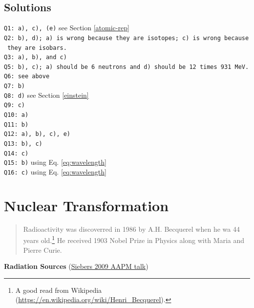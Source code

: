 \documentclass[]{book}
\let\rmarkdownfootnote\footnote%
\def\footnote{\protect\rmarkdownfootnote}
\theoremstyle{definition}
\theoremstyle{definition}
\theoremstyle{definition}
\theoremstyle{remark}
\begin{document}
\section{Solutions}\label{solutions}

\texttt{Q1:\ a),\ c),\ (e)} see Section \ref{atomic-rep}\\
\texttt{Q2:\ b),\ d);\ a)\ is\ wrong\ because\ they\ are\ isotopes;\ c)\ is\ wrong\ because\ they\ are\ isobars.}\\
\texttt{Q3:\ a),\ b),\ and\ c)}\\
\texttt{Q5:\ b),\ c);\ a)\ should\ be\ 6\ neutrons\ and\ d)\ should\ be\ 12\ times\ 931\ MeV.}\\
\texttt{Q6:\ see\ above}\\
\texttt{Q7:\ b)}\\
\texttt{Q8:\ d)} see Section \ref{einstein}\\
\texttt{Q9:\ c)}\\
\texttt{Q10:\ a)}\\
\texttt{Q11:\ b)}\\
\texttt{Q12:\ a),\ b),\ c),\ e)}\\
\texttt{Q13:\ b),\ c)}\\
\texttt{Q14:\ c)}\\
\texttt{Q15:\ b)} using Eq. \eqref{eq:wavelength}\\
\texttt{Q16:\ c)} using Eq. \eqref{eq:wavelength}

\chapter{Nuclear Transformation}\label{nut}

\begin{quote}
Radioactivity was discoverred in 1986 by A.H. Becquerel when he wa 44
years old.\footnote{A good read from Wikipedia
  (\url{https://en.wikipedia.org/wiki/Henri_Becquerel}).} He received
1903 Nobel Prize in Physics along with Maria and Pierre Curie.
\end{quote}

\textbf{Radiation Sources} (\href{https://vimeo.com/78875937}{Siebers
2009 AAPM talk})
\end{document}
